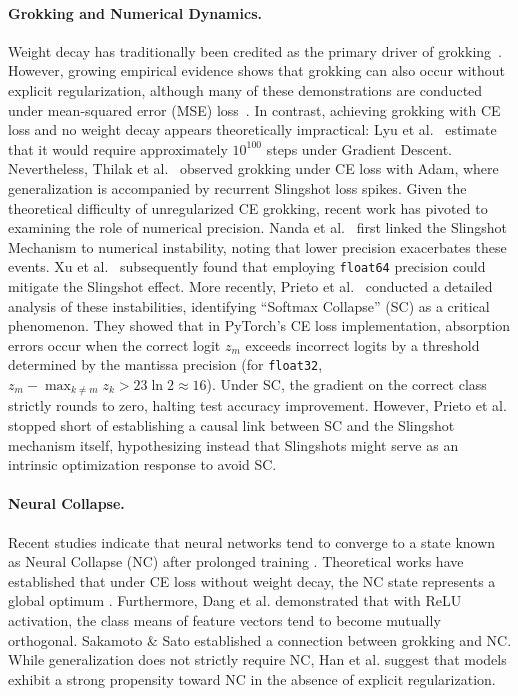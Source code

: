 \documentclass{article}
\theoremstyle{plain}
\theoremstyle{definition}
\theoremstyle{remark}
\begin{document}
\paragraph{Grokking and Numerical Dynamics.}
Weight decay has traditionally been credited as the primary driver of grokking~\cite{liu2023, lyu2024, boursier2025, tian2025}. 
However, growing empirical evidence shows that grokking can also occur without explicit regularization, 
although many of these demonstrations are conducted under mean-squared error (MSE) loss~\cite{gromov2023, kumar2024, golechha2024, prakash2025}. 
In contrast, achieving grokking with CE loss and no weight decay appears theoretically impractical: 
Lyu et al.~\cite{lyu2024} estimate that it would require approximately $10^{100}$ steps under Gradient Descent. 
Nevertheless, Thilak et al.~\cite{thilak2022} observed grokking under CE loss with Adam, 
where generalization is accompanied by recurrent Slingshot loss spikes. 
Given the theoretical difficulty of unregularized CE grokking, 
recent work has pivoted to examining the role of numerical precision.
Nanda et al.~\cite{nanda2023} first linked the Slingshot Mechanism to numerical instability, noting that lower precision exacerbates these events.
Xu et al.~\cite{xu2025} subsequently found that employing \texttt{float64} precision could mitigate the Slingshot effect. 
More recently, Prieto et al.~\cite{prieto2025} conducted a detailed analysis of these instabilities, identifying ``Softmax Collapse'' (SC) as a critical phenomenon.
They showed that in PyTorch's CE loss implementation, absorption errors occur 
when the correct logit $z_m$ exceeds incorrect logits by a threshold determined by the mantissa precision 
(for \texttt{float32}, $z_{m}-\max_{k\neq m} z_{k} > 23\ln 2\approx 16$). 
Under SC, the gradient on the correct class strictly rounds to zero, halting test accuracy improvement.
However, Prieto et al. stopped short of establishing a causal link between SC and the Slingshot mechanism itself, 
hypothesizing instead that Slingshots might serve as an intrinsic optimization response to avoid SC.

\paragraph{Neural Collapse.}
Recent studies indicate that neural networks tend to converge to a state known as Neural Collapse (NC) after prolonged training \cite{papyan2020}. 
Theoretical works have established that under CE loss without weight decay, 
the NC state represents a global optimum \cite{lu2022, garrod2025}. 
Furthermore, Dang et al. \cite{dang2024} demonstrated that with ReLU activation, 
the class means of feature vectors tend to become mutually orthogonal. 
Sakamoto \& Sato \cite{sakamoto2025} established a connection between grokking and NC. 
While generalization does not strictly require NC, Han et al. \cite{han2025} suggest that models exhibit a strong propensity toward NC in the absence of explicit regularization.
\end{document}
